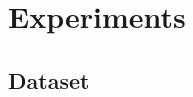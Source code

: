 \documentclass{article}
\begin{document}

\section{Experiments}
\subsection{Dataset}
\end{document}

